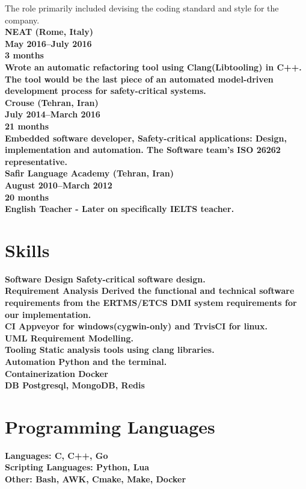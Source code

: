 \documentclass[8pt]{article}
\begin{document}
\begin{multicols}{2}
  \normalfont The role primarily included devising the coding standard and style for the company.\\[5pt]
  \bf NEAT (Rome, Italy)\\
  May 2016--July 2016\\
  3 months\\
  \normalfont Wrote an automatic refactoring tool using Clang(Libtooling) in C++. The tool would be the last piece of an automated model-driven development process for safety-critical systems.\\[5pt]
  \bf Crouse (Tehran, Iran)\\
  July 2014--March 2016\\
  21 months\\
  \normalfont Embedded software developer, Safety-critical applications: Design, implementation and automation. The Software team’s ISO 26262 representative.\\[5pt]
  \bf Safir Language Academy (Tehran, Iran)\\
  August 2010--March 2012\\
  20 months\\
  \normalfont English Teacher - Later on specifically IELTS teacher.\\[5pt]

  \section*{Skills}
  \bf Software Design \normalfont Safety-critical software design.\\[5pt]
  \bf Requirement Analysis \normalfont{} Derived the functional and technical software requirements from the ERTMS/ETCS DMI system requirements for our implementation.\\[5pt]
  \bf CI \normalfont Appveyor for windows(cygwin-only) and TrvisCI for linux.\\[5pt]
  \bf UML \normalfont Requirement Modelling.\\[5pt]
  \bf Tooling \normalfont Static analysis tools using clang libraries.\\[5pt]
  \bf Automation \normalfont Python and the terminal.\\[5pt]
  \bf Containerization \normalfont Docker\\[5pt]
  \bf DB \normalfont Postgresql, MongoDB, Redis\\[5pt]

  \section*{Programming Languages}
  \bf Languages: \normalfont C, C++, Go\\[5pt]
  \bf Scripting Languages: \normalfont Python, Lua\\[5pt]
  \bf Other: \normalfont Bash, AWK, Cmake, Make, Docker\\[5pt]


\end{multicols}
\end{document}
